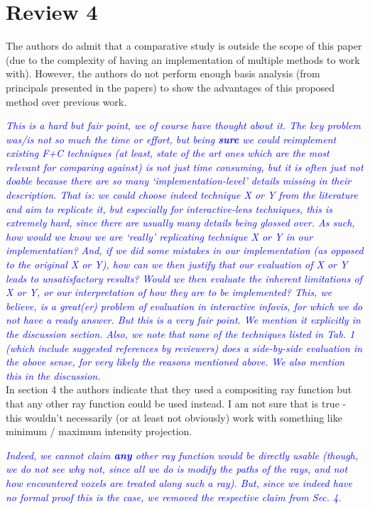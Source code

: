 \documentclass[a4paper,10pt]{article}
\newcommand{\rr}[1]{\emph{\textcolor{blue}{#1}}}
\begin{document}
\section{Review 4}

    The authors do admit that a comparative study
    is outside the scope of this paper (due to the complexity of having an
    implementation of multiple methods to work with). However, the authors do not
    perform enough basis analysis (from principals presented in the papers) to show
    the advantages of this proposed method over previous work.
    
    \rr{This is a hard but fair point, we of course have thought about it. The key problem was/is not so much the time or effort, but being \textbf{sure} we could reimplement existing F+C techniques (at least, state of the art ones which are the most relevant for comparing against) is not just time consuming, but it is often just not doable because there are so many `implementation-level' details missing in their description. That is: we could choose indeed technique X or Y from the literature and aim to replicate it, but especially for interactive-lens techniques, this is extremely hard, since there are usually many details being glossed over. As such, how would we know we are `really' replicating technique X or Y in our implementation? And, if we did some mistakes in our implementation (as opposed to the original X or Y), how can we then justify that our evaluation of X or Y leads to unsatisfactory results? Would we then evaluate the inherent limitations of X or Y, or our interpretation of how they are to be implemented? This, we believe, is a great(er) problem of evaluation in interactive infovis, for which we do not have a ready answer. But this is a very fair point. We mention it explicitly in the discussion section. Also, we note that none of the techniques listed in Tab. 1 (which include suggested references by reviewers) does a side-by-side evaluation in the above sense, for very likely the reasons mentioned above. We also mention this in the discussion.}\\
    
    In section 4 the authors indicate that they used a compositing ray function but
    that any other ray function could be used instead. I am not sure that is true -
    this wouldn't necessarily (or at least not obviously) work with something like
    minimum / maximum intensity projection.
    
    \rr{Indeed, we cannot claim \textbf{any} other ray function would be directly usable (though, we do not see why not, since all we do is modify the paths of the rays, and not how encountered voxels are treated along such a ray). But, since we indeed have no formal proof this is the case, we removed the respective claim from Sec. 4.}\\
\end{document}
